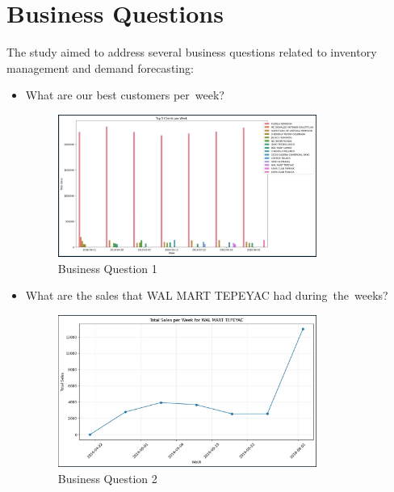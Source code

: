 \documentclass{article}
\begin{document}
\section{Business Questions}
The study aimed to address several business questions related to inventory management and demand forecasting:
\begin{itemize}
    \item What are our best customers per week?
    
    \begin{figure}[H] 
        \begin{center}
        \centering
        \includegraphics[width=0.8\textwidth]{images/question1.jpg}
        \caption{Business Question 1}
        \end{center}
    \end{figure} 

    \item What are the sales that WAL MART TEPEYAC had during the weeks? 

    \begin{figure}[H] 
        \begin{center}
        \centering
        \includegraphics[width=0.8\textwidth]{images/question2.jpg}
        \caption{Business Question 2}
        \end{center}
    \end{figure} 


\end{itemize}
\end{document}
